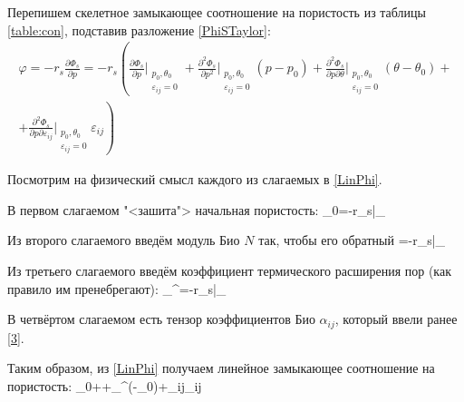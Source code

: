 \documentclass[main.tex]{subfiles}
\begin{document}
\begin{comment}
\begin{center}
	Ход чёрных
	\medskip
	
	\newgame
	\fenboard{r2qnrk1/p3p3/2p3p1/3pb2P/6p1/2N1B3/PPPQ4/2KR3R w - - 0 20}
	\showboard
\end{center}
\end{comment}

Перепишем скелетное замыкающее соотношение на пористость из таблицы \ref{table:con}, подставив разложение \ref{PhiSTaylor}:
\begin{multline}\label{LinPhi}
\varphi=-r_s\frac{\partial\Phi_s}{\partial p}=-r_s\left(\frac{\partial\Phi_s}{\partial p}\bigg|_{\substack{p_0,\theta_0\\\varepsilon_{ij}=0}}+\frac{\partial^2\Phi_s}{\partial p^2}\bigg|_{\substack{p_0,\theta_0\\\varepsilon_{ij}=0}}\left(p-p_0\right)+\frac{\partial^2\Phi_s}{\partial p\partial\theta}\bigg|_{\substack{p_0,\theta_0\\\varepsilon_{ij}=0}}\left(\theta-\theta_0\right)+\right.\\+\left.\frac{\partial^2\Phi_s}{\partial p\partial\varepsilon_{ij}}\bigg|_{\substack{p_0,\theta_0\\\varepsilon_{ij}=0}}\varepsilon_{ij}\right)
\end{multline}

Посмотрим на физический смысл каждого из слагаемых в \eqref{LinPhi}.

В первом слагаемом "<зашита"> начальная пористость:
\beq
\varphi_0=-r_s\bigg|_{}
\eeq

Из второго слагаемого введём модуль Био $N$ так, чтобы его обратный
\beq\label{Bio}
=-r_s\bigg|_{}
\eeq

Из третьего слагаемого введём коэффициент термического расширения пор (как правило им пренебрегают):
\beq
\alpha_\theta^\varphi=-r_s\bigg|_{}
\eeq

В четвёртом слагаемом есть тензор коэффициентов Био $\alpha_{ij}$, который ввели ранее \eqref{3}.

Таким образом, из \eqref{LinPhi} получаем линейное замыкающее соотношение на пористость:
\beq\label{PhiConsRel}
\varphi\approx\varphi_0++\alpha_\theta^\varphi\left(\theta-\theta_0\right)+\alpha_{ij}\varepsilon_{ij}
\eeq
\end{document}
